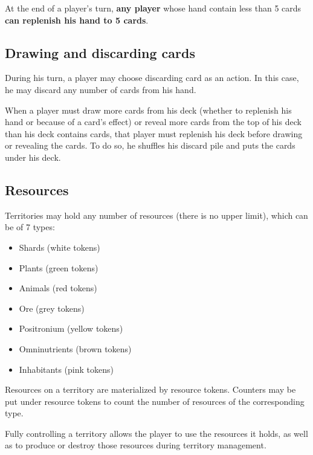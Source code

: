 \documentclass[a4paper]{article}
\begin{document}
    \vspace{-0.7em}
    At the end of a player's turn, \textbf{any player} whose hand contain less than 5
    cards \textbf{can replenish his hand to 5 cards}.


  \subsection{Drawing and discarding cards}
    
    During his turn, a player may choose discarding card as an action.
    In this case, he may discard any number of cards from his hand.

    When a player must draw more cards from his deck
    (whether to replenish his hand or because of a card's effect)
    or reveal more cards from the top of his deck than his deck contains cards,
    that player must replenish his deck before drawing or revealing the cards.
    To do so, he shuffles his discard pile and puts the cards under his deck.


\newpage
  \subsection{Resources}
  
    Territories may hold any number of resources (there is no upper limit),
    which can be of 7 types:
    
    \vspace{-1.3em}
    \begin{itemize}
        \item Shards (white tokens)
        \item Plants (green tokens)
        \item Animals (red tokens)
        \item Ore (grey tokens)
        \item Positronium (yellow tokens)
        \item Omninutrients (brown tokens)
        \item Inhabitants (pink tokens)
    \end{itemize}
    
    \vspace{-0.7em}
    Resources on a territory are materialized by resource tokens.
    Counters may be put under resource tokens to count the number of
    resources of the corresponding type.
    
    Fully controlling a territory allows the player to use the resources it holds,
    as well as to produce or destroy those resources during territory management.
  
\end{document}
